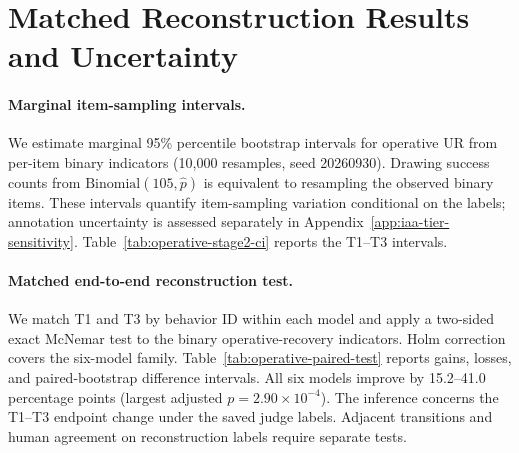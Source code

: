 \section{Matched Reconstruction Results and Uncertainty}
\label{app:matched-tests}



\paragraph{Marginal item-sampling intervals.}
We estimate marginal 95\% percentile bootstrap intervals for operative UR from per-item binary indicators (10,000 resamples, seed 20260930). Drawing success counts from $\mathrm{Binomial}(105,\hat p)$ is equivalent to resampling the observed binary items. These intervals quantify item-sampling variation conditional on the labels; annotation uncertainty is assessed separately in Appendix~\ref{app:iaa-tier-sensitivity}. Table~\ref{tab:operative-stage2-ci} reports the T1--T3 intervals.



\paragraph{Matched end-to-end reconstruction test.}
We match T1 and T3 by behavior ID within each model and apply a two-sided exact McNemar test to the binary operative-recovery indicators. Holm correction covers the six-model family. Table~\ref{tab:operative-paired-test} reports gains, losses, and paired-bootstrap difference intervals. All six models improve by 15.2--41.0 percentage points (largest adjusted $p=2.90\times10^{-4}$). The inference concerns the T1--T3 endpoint change under the saved judge labels. Adjacent transitions and human agreement on reconstruction labels require separate tests.
